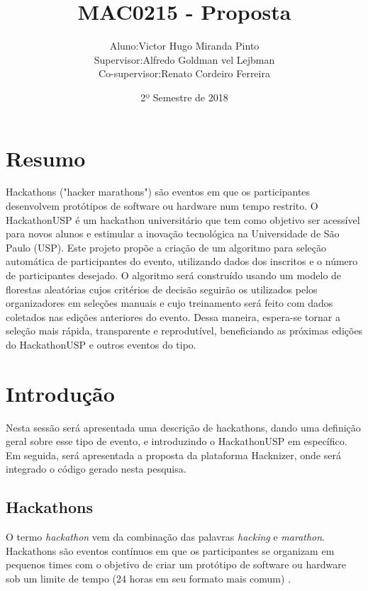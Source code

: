 \documentclass[10pt,twoside,a4paper]{article}
\title{MAC0215 - Proposta}
\author{
  \begin{tabular}{rl}
    Aluno:      & Victor Hugo Miranda Pinto \\
    Supervisor: & Alfredo Goldman vel Lejbman \\
    Co-supervisor: & Renato Cordeiro Ferreira
  \end{tabular}
}
\date{2º Semestre de 2018}
\begin{document}
\onehalfspacing

\maketitle

\section{Resumo}
  Hackathons ("hacker marathons") são eventos em que os participantes desenvolvem protótipos de software ou hardware num tempo restrito. O HackathonUSP é um hackathon universitário que tem como objetivo ser acessível para novos alunos e estimular a inovação tecnológica na Universidade de São Paulo (USP). Este projeto propõe a criação de um algoritmo para seleção automática de participantes do evento, utilizando dados dos inscritos e o número de participantes desejado. O algoritmo será construído usando um modelo de florestas aleatórias cujos critérios de decisão seguirão os utilizados pelos organizadores em seleções manuais e cujo treinamento será feito com dados coletados nas edições anteriores do evento. Dessa maneira, espera-se tornar a seleção mais rápida, transparente e reprodutível, beneficiando as próximas edições do HackathonUSP e outros eventos do tipo.

\section{Introdução}

  Nesta sessão será apresentada uma descrição de hackathons, dando uma definição geral sobre esse tipo de evento, e introduzindo o HackathonUSP em específico. Em seguida, será apresentada a proposta da plataforma Hacknizer, onde será integrado o código gerado nesta pesquisa.

  \subsection{Hackathons}
  
    O termo \textit{hackathon} vem da combinação das palavras \textit{hacking} e \textit{marathon}. Hackathons são eventos contínuos em que os participantes se organizam em pequenos times com o objetivo de criar um protótipo de software ou hardware sob um limite de tempo (24 horas em seu formato mais comum) \cite{Komssi2015WhatFor}.
    
\end{document}
